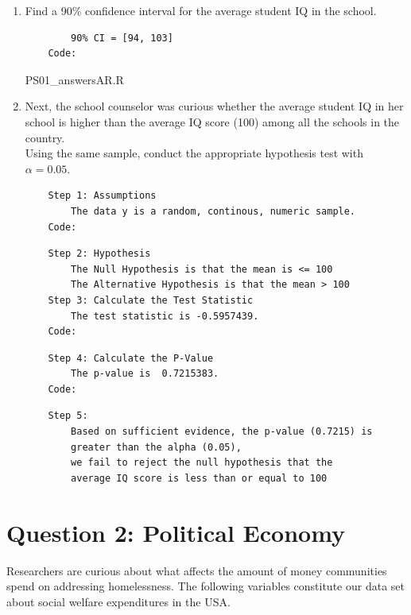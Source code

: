 \documentclass[12pt,letterpaper]{article}
\begin{document}
\begin{enumerate}
	\item Find a 90\% confidence interval for the average student IQ in the school.\\
	
	\begin{Verbatim}
		90% CI = [94, 103]
	Code: 
	\end{Verbatim}
			 {PS01_answersAR.R}  
	\vspace{4cm}
	\item Next, the school counselor was curious  whether  the average student IQ in her school is higher than the average IQ score (100) among all the schools in the country.\\ 
	\noindent Using the same sample, conduct the appropriate hypothesis test with $\alpha=0.05$.
	\begin{Verbatim}
	Step 1: Assumptions
		The data y is a random, continous, numeric sample.
	Code:
	\end{Verbatim}
	  
	\begin{Verbatim}
	Step 2: Hypothesis
		The Null Hypothesis is that the mean is <= 100
		The Alternative Hypothesis is that the mean > 100
	Step 3: Calculate the Test Statistic
		The test statistic is -0.5957439.
	Code:
		\end{Verbatim}
		  
	\begin{Verbatim}
	Step 4: Calculate the P-Value
		The p-value is  0.7215383.
	Code:
	\end{Verbatim}
		
	\begin{Verbatim}
	Step 5:
		Based on sufficient evidence, the p-value (0.7215) is 
		greater than the alpha (0.05),
		we fail to reject the null hypothesis that the 
		average IQ score is less than or equal to 100
	\end{Verbatim}
\end{enumerate}

\newpage

	\section*{Question 2: Political Economy}

\noindent Researchers are curious about what affects the amount of money communities spend on addressing homelessness. The following variables constitute our data set about social welfare expenditures in the USA. \\
\vspace{.5cm}
\end{document}
